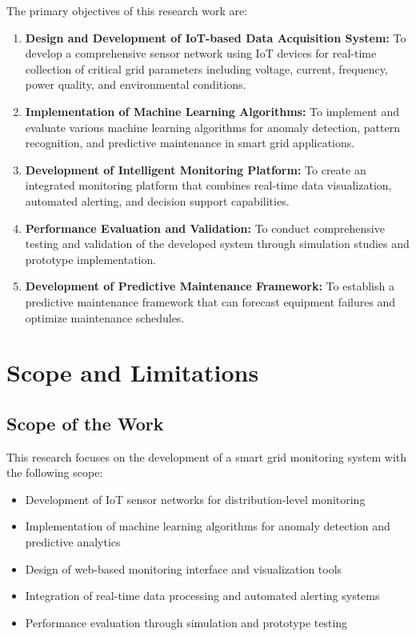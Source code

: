 The primary objectives of this research work are:

\begin{enumerate}
\item \textbf{Design and Development of IoT-based Data Acquisition System:} To develop a comprehensive sensor network using IoT devices for real-time collection of critical grid parameters including voltage, current, frequency, power quality, and environmental conditions.

\item \textbf{Implementation of Machine Learning Algorithms:} To implement and evaluate various machine learning algorithms for anomaly detection, pattern recognition, and predictive maintenance in smart grid applications.

\item \textbf{Development of Intelligent Monitoring Platform:} To create an integrated monitoring platform that combines real-time data visualization, automated alerting, and decision support capabilities.

\item \textbf{Performance Evaluation and Validation:} To conduct comprehensive testing and validation of the developed system through simulation studies and prototype implementation.

\item \textbf{Development of Predictive Maintenance Framework:} To establish a predictive maintenance framework that can forecast equipment failures and optimize maintenance schedules.
\end{enumerate}

\section{Scope and Limitations}
\label{sec:scope_limitations}

\subsection{Scope of the Work}
This research focuses on the development of a smart grid monitoring system with the following scope:

\begin{itemize}
\item Development of IoT sensor networks for distribution-level monitoring
\item Implementation of machine learning algorithms for anomaly detection and predictive analytics
\item Design of web-based monitoring interface and visualization tools
\item Integration of real-time data processing and automated alerting systems
\item Performance evaluation through simulation and prototype testing
\end{itemize}

